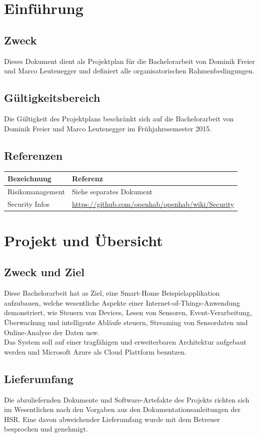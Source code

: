 \section*{Einführung}
	\subsection*{Zweck}
		Dieses Dokument dient als Projektplan für die Bachelorarbeit von Dominik Freier und Marco Leutenegger und definiert alle organisatorischen Rahmenbedingungen.

	\subsection*{Gültigkeitsbereich}
		Die Gültigkeit des Projektplans beschränkt sich auf die Bachelorarbeit von Dominik Freier und Marco Leutenegger im Frühjahrssemester 2015.

	\subsection*{Referenzen}
		\begin{tabularx}{\textwidth}{lX}
			\textbf{Bezeichnung}	& \textbf{Referenz}
			\\ \hline
				Risikomanagement	 &
				Siehe separates Dokument
			\\ \hline
				Security Infos &
				\url{https://github.com/openhab/openhab/wiki/Security}
			\\ \hline
		\end{tabularx}
\pagebreak

\section*{Projekt und Übersicht}
	\subsection*{Zweck und Ziel}
		Diese Bachelorarbeit hat as Ziel, eine Smart-Home Beispielapplikation aufzubauen, 
		welche wesentliche Aspekte einer Internet-of-Things-Anwendung demonstriert, wie 
		Steuern von Devices, Lesen von Sensoren, Event-Verarbeitung, Überwachung und 
		intelligente Abläufe steuern, Streaming von Sensordaten und Online-Analyse der 
		Daten usw. \\ Das System soll auf einer tragfähigen und erweiterbaren Architektur 
		aufgebaut werden und Microsoft Azure als Cloud Plattform benutzen.

	\subsection*{Lieferumfang}
		Die abzuliefernden Dokumente und Software-Artefakte des Projekts richten sich im Wesentlichen 
		nach den Vorgaben aus den Dokumentationsanleitungen der HSR. Eine davon abweichender Lieferumfang 
		wurde mit dem Betreuer besprochen und genehmigt.

